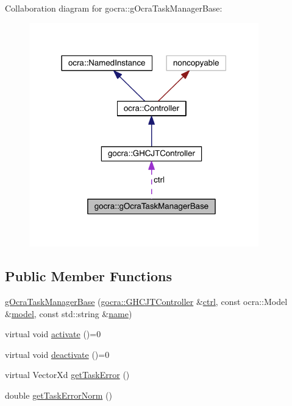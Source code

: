 Collaboration diagram for gocra\+:\+:g\+Ocra\+Task\+Manager\+Base\+:\nopagebreak
\begin{figure}[H]
\begin{center}
\leavevmode
\includegraphics[width=282pt]{da/d7b/classgocra_1_1gOcraTaskManagerBase__coll__graph}
\end{center}
\end{figure}
\subsection*{Public Member Functions}
\begin{DoxyCompactItemize}
\item 
\hyperlink{classgocra_1_1gOcraTaskManagerBase_aeb3bde0cba73fbf7cf261f5293133f54}{g\+Ocra\+Task\+Manager\+Base} (\hyperlink{classgocra_1_1GHCJTController}{gocra\+::\+G\+H\+C\+J\+T\+Controller} \&\hyperlink{classgocra_1_1gOcraTaskManagerBase_a52d76d9b54d92f3d31faeaafda99e4c7}{ctrl}, const ocra\+::\+Model \&\hyperlink{classgocra_1_1gOcraTaskManagerBase_adc439e7170f7120611fc6d009d06404e}{model}, const std\+::string \&\hyperlink{classgocra_1_1gOcraTaskManagerBase_adfda0d31ecfa9afea1380f076a472f37}{name})
\item 
virtual void \hyperlink{classgocra_1_1gOcraTaskManagerBase_a50cf1c408749d6e9dcfaf50bcab77dee}{activate} ()=0
\item 
virtual void \hyperlink{classgocra_1_1gOcraTaskManagerBase_a7cf9111e69aee47a39fe0f2976a20d6c}{deactivate} ()=0
\item 
virtual Vector\+Xd \hyperlink{classgocra_1_1gOcraTaskManagerBase_a5c40a14b3a1d5a6519da422310d28f97}{get\+Task\+Error} ()
\item 
double \hyperlink{classgocra_1_1gOcraTaskManagerBase_ab38cda0adc96728270cc881d83644fda}{get\+Task\+Error\+Norm} ()
\end{DoxyCompactItemize}
